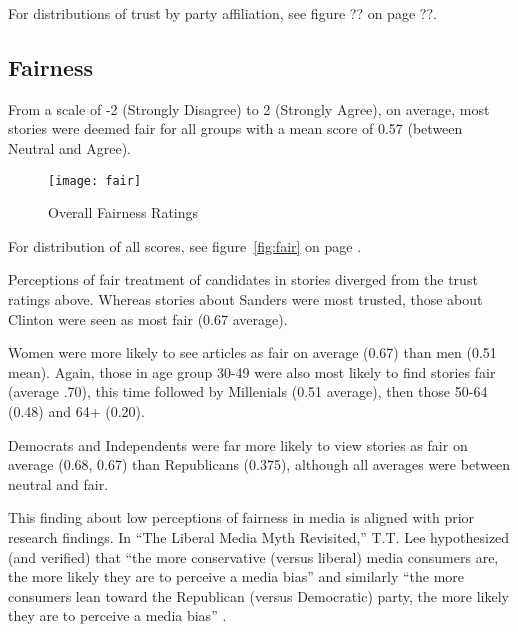 For distributions of trust by party affiliation, see figure ?? on page ??.

\subsection{Fairness}
From a scale of -2 (Strongly Disagree) to 2 (Strongly Agree), on average, most stories were deemed fair for all groups with a mean score of 0.57 (between Neutral and Agree). 

\begin{figure}[H]  
\centering 
  \texttt{[image: fair]}  
  \caption{Overall Fairness Ratings 
  \label{fig:fairness}}
\end{figure}

For distribution of all scores, see figure~\ref{fig:fair} on page \pageref{fig:fair}.

Perceptions of fair treatment of candidates in stories diverged from the trust ratings above. Whereas stories about Sanders were most trusted, those about Clinton were seen as most fair (0.67 average).


Women were more likely to see articles as fair on average (0.67) than men (0.51 mean).
Again, those in age group 30-49 were also most likely to find stories fair (average .70), this time followed by Millenials (0.51 average), then those 50-64 (0.48) and 64+ (0.20).

Democrats and Independents were far more likely to view stories as fair on average (0.68, 0.67) than Republicans (0.375), although all averages were between neutral and fair.

This finding about low perceptions of fairness in media is aligned with prior research findings. In ``The Liberal Media Myth Revisited,'' T.T. Lee hypothesized (and verified) that ``the more conservative (versus liberal) media consumers are, the more likely they are to perceive a media bias'' and similarly ``the more consumers lean toward the Republican (versus Democratic) party, the more likely they are to perceive a media bias'' \cite{lee2005liberal}.


 


